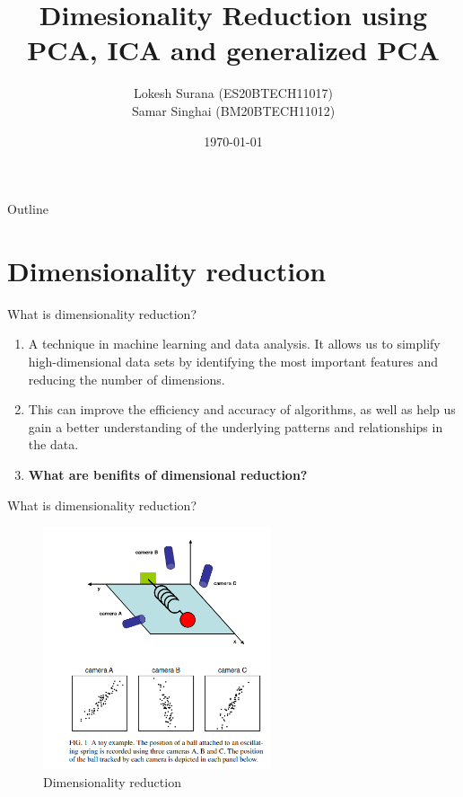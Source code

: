 \documentclass{beamer}
\title{Dimesionality Reduction using PCA, ICA and generalized PCA}
\author{Lokesh Surana (ES20BTECH11017)\\ Samar Singhai (BM20BTECH11012)}
\date{\today}
\begin{document}
\begin{frame}
    \titlepage
\end{frame}

\begin{frame}[allowframebreaks]{Outline}
    \tableofcontents
\end{frame}

\section{Dimensionality reduction}
\begin{frame}{What is dimensionality reduction?}
    \begin{enumerate}
        \item A technique in machine learning and data analysis. It allows us to simplify high-dimensional data sets by identifying the most important features and reducing the number of dimensions.
        \item This can improve the efficiency and accuracy of algorithms, as well as help us gain a better understanding of the underlying patterns and relationships in the data.
        \item \textbf{What are benifits of dimensional reduction?}
    \end{enumerate}
\end{frame}

\begin{frame}{What is dimensionality reduction?}
    \begin{figure}
        \centering
        \includegraphics[width=0.6\textwidth]{toy_readings.png}
        \caption{Dimensionality reduction}
        \label{fig:my_label}
    \end{figure}
\end{frame}
\end{document}
